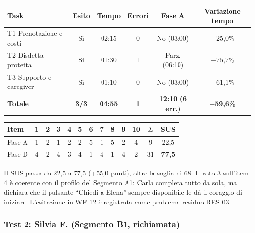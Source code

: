 \begin{center}
\label{tab:d-test-carla}
\footnotesize
\begin{tabularx}{\linewidth}{@{}>{\raggedright\arraybackslash}X c c c c c@{}}
\toprule
\textbf{Task} & \textbf{Esito} & \textbf{Tempo} & \textbf{Errori} & \textbf{Fase A} & \textbf{Variazione tempo} \\
\midrule
T1 Prenotazione e costi & Sì & 02:15 & 0 & No (03:00) & $-$25,0\% \\
T2 Disdetta protetta & Sì & 01:30 & 1 & Parz. (06:10) & $-$75,7\% \\
T3 Supporto e caregiver & Sì & 01:10 & 0 & No (03:00) & $-$61,1\% \\
\midrule
\textbf{Totale} & \textbf{3/3} & \textbf{04:55} & \textbf{1} & \textbf{12:10 (6 err.)} & \textbf{$-$59,6\%} \\
\bottomrule
\end{tabularx}
\end{center}

\begin{center}
\label{tab:d-sus-carla}
\footnotesize
\setlength{\tabcolsep}{3.5pt}
\begin{tabular}{@{}l *{10}{c} c c@{}}
\toprule
\textbf{Item} & \textbf{1} & \textbf{2} & \textbf{3} & \textbf{4} & \textbf{5} & \textbf{6} & \textbf{7} & \textbf{8} & \textbf{9} & \textbf{10} & $\Sigma$ & \textbf{SUS} \\
\midrule
Fase A & 1 & 2 & 1 & 2 & 2 & 5 & 1 & 5 & 2 & 4 & 9 & 22,5 \\
Fase D & 4 & 2 & 4 & 3 & 4 & 1 & 4 & 1 & 4 & 2 & 31 & \textbf{77,5} \\
\bottomrule
\end{tabular}
\end{center}

Il SUS passa da 22,5 a 77,5 (+55,0 punti), oltre la soglia di 68. Il voto 3 sull'item 4 è coerente con il profilo del Segmento A1: Carla completa tutto da sola, ma dichiara che il pulsante ``Chiedi a Elena'' sempre disponibile le dà il coraggio di iniziare. L'esitazione in WF-12 è registrata come problema residuo RES-03.

\subsubsection{Test 2: Silvia F. (Segmento B1, richiamata)}

